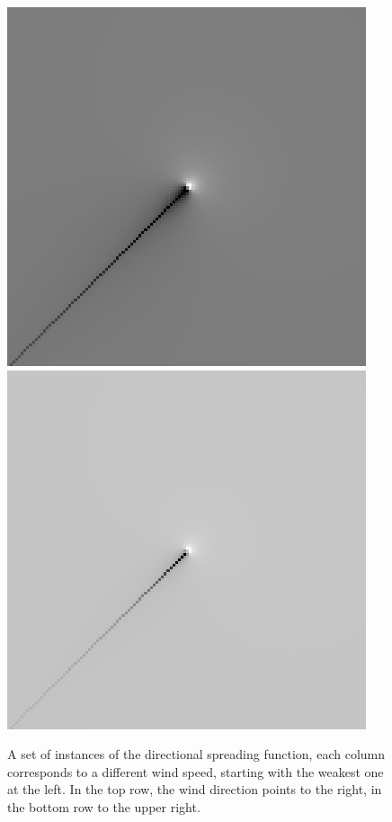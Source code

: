 \begin{figure}
{ }
 \subbottom
 {
 \includegraphics[scale=1]{figures/dfilt_wur_sqrt50.png}
 }
 \subbottom
 {
 \includegraphics[scale=1]{figures/dfilt_wur_sqrt200.png}
 }
\caption{A set of instances of the directional spreading function, each column 
corresponds to a different wind speed, starting with the weakest one at the 
left. In the top row, the wind direction points to the right, in the bottom row 
to the upper right.}
\label{fig:directional_filter}
\end{figure}
%
